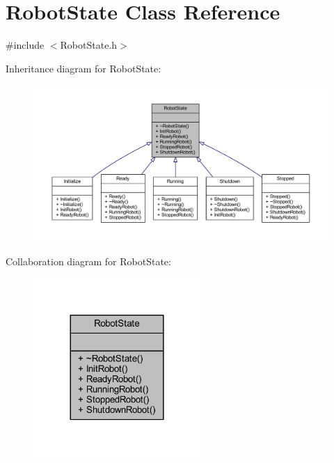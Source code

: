 \hypertarget{class_robot_state}{}\section{Robot\+State Class Reference}
\label{class_robot_state}


{\ttfamily \#include $<$Robot\+State.\+h$>$}



Inheritance diagram for Robot\+State\+:
\nopagebreak
\begin{figure}[H]
\begin{center}
\leavevmode
\includegraphics[width=350pt]{class_robot_state__inherit__graph}
\end{center}
\end{figure}


Collaboration diagram for Robot\+State\+:
\nopagebreak
\begin{figure}[H]
\begin{center}
\leavevmode
\includegraphics[width=180pt]{class_robot_state__coll__graph}
\end{center}
\end{figure}
